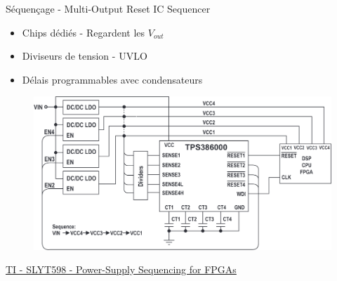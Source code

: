 \begin{frame}{Séquençage - Multi-Output Reset IC Sequencer}
    \begin{itemize}
        \item Chips dédiés - Regardent les $V_{out}$
        \item Diviseurs de tension - UVLO
        \item Délais programmables avec condensateurs
    \end{itemize}
    \vfill
    \begin{figure}
        \includegraphics[width=\textwidth, height=0.6\textheight, keepaspectratio]{pictures/power-supply-sequencer.png}
    \end{figure}
    \vspace{-8pt}
    \href{https://www.ti.com/lit/an/slyt598/slyt598.pdf}{TI - SLYT598 - Power-Supply Sequencing for FPGAs}
\end{frame}


